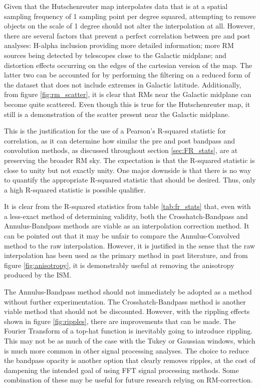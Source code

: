 Given that the Hutschenreuter map interpolates data that is at a spatial sampling frequency of 1 sampling point per degree squared, attempting to remove objects on the scale of 1 degree should not alter the interpolation at all. However, there are several factors that prevent a perfect correlation between pre and post analyses: H-alpha inclusion providing more detailed information; more RM sources being detected by telescopes close to the Galactic midplane; and distortion effects occurring on the edges of the cartesian version of the map. The latter two can be accounted for by performing the filtering on a reduced form of the dataset that does not include extremes in Galactic latitude. Additionally, from figure \ref{fig:rm_scatter}, it is clear that RMs near the Galactic midplane can become quite scattered. Even though this is true for the Hutschenreuter map, it still is a demonstration of the scatter present near the Galactic midplane.


This is the justification for the use of a Pearson's R-squared statistic for correlation, as it can determine how similar the pre and post bandpass and convolution methods, as discussed throughout section \ref{sec:FR_stats}, are at preserving the broader RM sky. The expectation is that the R-squared statistic is close to unity but not exactly unity. One major downside is that there is no way to quantify the appropriate R-squared statistic that should be desired. Thus, only a high R-squared statistic is possible qualifier.


It is clear from the R-squared statistics from table \ref{tab:fr_stats} that, even with a less-exact method of determining validity, both the Crosshatch-Bandpass and Annulus-Bandpass methods are viable as an interpolation correction method. It can be pointed out that it may be unfair to compare the Annulus-Convolved method to the raw interpolation. However, it is justified in the sense that the raw interpolation has been used as the primary method in past literature, and from figure \ref{fig:anisotropy}, it is demonstrably useful at removing the anisotropy produced by the ISM.


The Annulus-Bandpass method should not immediately be adopted as a method without further experimentation. The Crosshatch-Bandpass method is another viable method that should not be discounted. However, with the rippling effects shown in figure \ref{fig:ripples}, there are improvements that can be made. The Fourier Transform of a top-hat function is inevitably going to introduce rippling. This may not be as much of the case with the Tukey or Gaussian windows, which is much more common in other signal processing analyses. The choice to reduce the bandpass opacity is another option that clearly removes ripples, at the cost of dampening the intended goal of using FFT signal processing methods. Some combination of these may be useful for future research relying on RM-correction.


